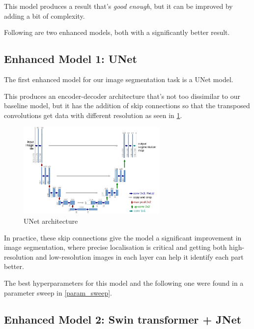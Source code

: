 This model produces a result that's \textit{good enough}, but it can be improved by adding a bit of complexity.

Following are two enhanced models, both with a significantly better result.

\newpage{}
\subsection{Enhanced Model 1: UNet }

The first enhanced model for our image segmentation task is a UNet model\cite{unet}.

This produces an encoder-decoder architecture that's not too dissimilar to our baseline model, but it has the addition of skip connections so that the transposed convolutions get data with different resolution as seen in \cref{unet}.

\begin{figure}[h]
    \centering 
    \includegraphics[width=0.65\textwidth]{u-net-illustration-correct-scale2.pdf}
    \caption{UNet architecture}
    \label{unet}
\end{figure}

In practice, these skip connections give the model a significant improvement in image segmentation, where precise localisation is critical and getting both high-resolution and low-resolution images in each layer can help it identify each part better.

The best hyperparameters for this model and the following one were found in a parameter sweep in \cref{param_sweep}.

\subsection{Enhanced Model 2: Swin transformer + JNet }


